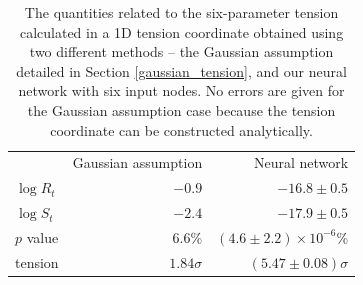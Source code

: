 \documentclass[%
 reprint,
 amsmath,amssymb,
 aps,
]{revtex4-2}
\begin{document}
\begin{table}
    \begin{ruledtabular}
    \begin{tabular}{lrr}
         & Gaussian assumption & Neural network \\
        \colrule
        $\log R_t$ & $-0.9$ & $-16.8 \pm 0.5$ \\
        $\log S_t$ & $-2.4$ & $-17.9 \pm 0.5$ \\
        $p$ value & $6.6\%$ & $(4.6 \pm 2.2) \times 10^{-6}\% $ \\
        tension & $1.84\sigma$ & $(5.47 \pm 0.08)\sigma$ \\
    \end{tabular}
    \end{ruledtabular}
    \caption{The quantities related to the six-parameter tension calculated in a 1D tension coordinate obtained using two different methods -- the Gaussian assumption detailed in Section \ref{gaussian_tension}, and our neural network with six input nodes. No errors are given for the Gaussian assumption case because the tension coordinate can be constructed analytically.}
    \label{table:six_params}
\end{table}
\end{document}
